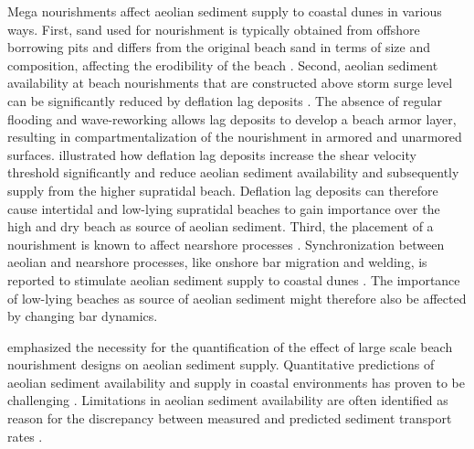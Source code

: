 Mega nourishments affect aeolian sediment supply to coastal dunes in
various ways. First, sand used for nourishment is typically obtained
from offshore borrowing pits and differs from the original beach sand
in terms of size and composition, affecting the erodibility of the
beach \citep{VanDerWal1998, VanDerWal2000}. Second, aeolian sediment
availability \citep[following the definition of][]{Kocurek1999} at
beach nourishments that are constructed above storm surge level can be
significantly reduced by deflation lag deposits
\citep{Jackson2010}. The absence of regular flooding and
wave-reworking allows lag deposits to develop a beach armor layer,
resulting in compartmentalization of the nourishment in armored and
unarmored surfaces. \citet{McKennaNeuman2012} illustrated how
deflation lag deposits increase the shear velocity threshold
significantly and reduce aeolian sediment availability and
subsequently supply from the higher supratidal beach. Deflation lag
deposits can therefore cause intertidal and low-lying supratidal
beaches to gain importance over the high and dry beach as source of
aeolian sediment. Third, the placement of a nourishment is known to
affect nearshore processes \citep{Grunnet2005, Ojeda2008,
  deSchipper2013}.  Synchronization between aeolian and nearshore
processes, like onshore bar migration and welding, is reported to
stimulate aeolian sediment supply to coastal dunes \citep{Houser2009,
  Anthony2013}. The importance of low-lying beaches as source of
aeolian sediment might therefore also be affected by changing bar
dynamics.

%
%


\citet{Jackson2011} emphasized the necessity for the quantification of
the effect of large scale beach nourishment designs on aeolian
sediment supply. Quantitative predictions of aeolian sediment
availability and supply in coastal environments has proven to be
challenging \citep{Sherman1998, Sherman2012}. Limitations in aeolian
sediment availability are often identified as reason for the
discrepancy between measured and predicted sediment transport rates
\citep{DelgadoFernandez2012, deVries2014b, Lynch2016}.

